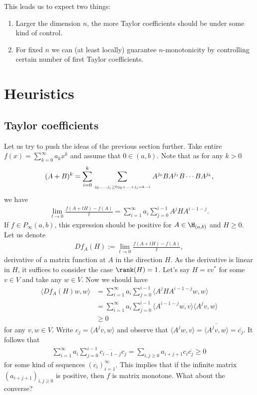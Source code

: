 This leads us to expect two things:

\begin{enumerate}
	\item Larger the dimension $n$, the more Taylor coefficients should be under some kind of control.
	\item For fixed $n$ we can (at least locally) guarantee $n$-monotonicity by controlling certain number of first Taylor coefficients.
\end{enumerate}

\section{Heuristics}

\subsection{Taylor coefficients}

Let us try to push the ideas of the previous section further. Take entire $f(x) = \sum_{k = 0}^{\infty} a_{k} x^{k}$ and assume that $0 \in (a, b)$. Note that as for any $k > 0$
\begin{align*}
	(A + B)^k = \sum_{i = 0}^{k} \sum_{\atop{j_{0}, \ldots, j_{i} \geq 0}{j_{0} + \ldots + j_{i} = k - i}} A^{j_{0}} B A^{j_{1}} B \cdots B A^{j_{k}},
\end{align*}
we have
\begin{align*}
	\lim_{t \to 0} \frac{f(A + t H) - f(A)}{t} = \sum_{i = 1}^{\infty} a_{i} \sum_{j = 0}^{i - 1} A^{j} H A^{i - 1 - j}.
\end{align*}
If $f \in P_{\infty}(a, b)$, this expression should be positive for $A \in \H_{(a, b)}$ and $H \geq 0$. Let us denote
\begin{align*}
	D f_{A}(H) := \lim_{t \to 0} \frac{f(A + t H) - f(A)}{t},
\end{align*}
derivative of a matrix function at $A$ in the direction $H$. As the derivative is linear in $H$, it suffices to consider the case $\rank(H) = 1$. Let's say $H = v v^{*}$ for some $v \in V$ and take any $w \in V$. Now we should have
\begin{align*}
	\langle D f_{A}(H) w, w \rangle &= \sum_{i = 1}^{\infty} a_{i} \sum_{j = 0}^{i - 1} \langle A^{j} H A^{i - 1 - j} w, w \rangle \\
	&= \sum_{i = 1}^{\infty} a_{i} \sum_{j = 0}^{i - 1} \langle  A^{i - 1 - j} w, v \rangle \langle A^{j} v, w \rangle \\
	&\geq 0
\end{align*}
for any $v, w \in V$. Write $c_{j} = \langle A^{j} v, w \rangle$ and observe that $\langle  A^{j} w, v \rangle = \overline{\langle A^{j} v, w \rangle} = \overline{c_{j}}$. It follows that
\begin{align*}
	\sum_{i = 1}^{\infty} a_{i} \sum_{j = 0}^{i - 1} \overline{c_{i - 1 - j}} c_{j} = \sum_{i, j \geq 0} a_{i + j + 1} c_{i} \overline{c_{j}} \geq 0
\end{align*}
for some kind of sequences $(c_{i})_{i = 1}^{\infty}$. This implies that if the infinite matrix $(a_{i + j + 1})_{i, j \geq 0}$ is positive, then $f$ is matrix monotone. What about the converse?

